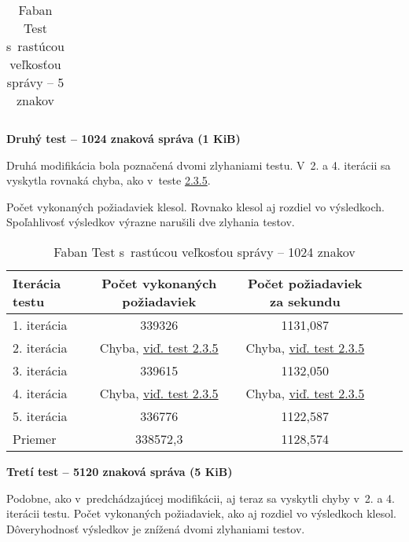 \documentclass[12pt,oneside,final]{fithesis-utf8}
\begin{document}
\begin{itemize}
\begin{table}[H]
\begin{center}
\begin{tabular}{ | l | c | c | c | c |}
\end{tabular}
\end{center}
\caption{Faban Test s~rastúcou veľkosťou správy -- 5 znakov}
\end{table}


\textbf{Druhý test -- 1024 znaková správa (1 KiB)}

Druhá modifikácia bola poznačená dvomi zlyhaniami testu. V~2. a 4. iterácii sa vyskytla rovnaká chyba, ako v~teste \hyperlink{label}{2.3.5}.
\par Počet vykonaných požiadaviek klesol. Rovnako klesol aj rozdiel vo výsledkoch. Spoľahlivosť výsledkov výrazne narušili dve zlyhania testov.

\begin{table}[H]
\begin{center}
\begin{tabular}{ | l | c | c | c | c |}
		\hline
		 \textbf{Iterácia testu} & \textbf{Počet vykonaných požiadaviek} & \textbf{Počet požiadaviek za sekundu} \\ \hline
		 1. iterácia & 339326 & 1131,087 \\ \hline
		 2. iterácia & Chyba, \hyperlink{label}{viď. test 2.3.5} & Chyba, \hyperlink{label}{viď. test 2.3.5} \\ \hline
		 3. iterácia & 339615 & 1132,050 \\ \hline
		 4. iterácia & Chyba, \hyperlink{label}{viď. test 2.3.5} & Chyba, \hyperlink{label}{viď. test 2.3.5} \\ \hline
		 5. iterácia & 336776 & 1122,587 \\ \hline
		 Priemer & 338572,3 & 1128,574 \\ \hline
		 
\end{tabular}
\end{center}
\caption{Faban Test s~rastúcou veľkosťou správy -- 1024 znakov}
\end{table}


\textbf{Tretí test -- 5120 znaková správa (5 KiB)}

Podobne, ako v~predchádzajúcej modifikácii, aj teraz sa vyskytli chyby v~2. a 4. iterácii testu. Počet vykonaných požiadaviek, ako aj rozdiel vo výsledkoch klesol. Dôveryhodnosť výsledkov je znížená dvomi zlyhaniami testov.


\end{itemize}
\end{document}
